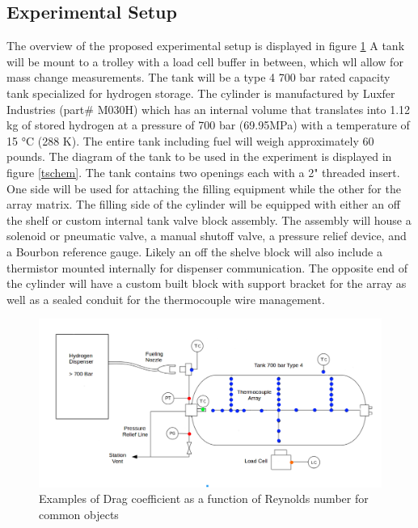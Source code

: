 \documentclass[paper=a4, fontsize=11pt, abstract=on]{scrartcl}
\numberwithin{equation}{section}		%
\numberwithin{figure}{section}			%
\numberwithin{table}{section}				%
\begin{document}
\subsection{Experimental Setup}
The overview of the proposed experimental setup is displayed in figure \ref{exp}
A tank will be mount to a trolley with a load cell buffer in between, which wll allow for mass change measurements. The tank will be a type 4 700 bar rated capacity tank specialized for hydrogen storage. The cylinder is manufactured by Luxfer Industries (part\# M030H) which has an internal volume that translates into 1.12 kg of stored hydrogen at a pressure of 700 bar (69.95MPa) with a temperature of 15 °C (288 K). The entire tank including fuel will weigh approximately 60 pounds. The diagram of the tank to be used in the experiment is displayed in figure \ref{tschem}. The tank contains two openings each with a 2" threaded insert. One side will be used for attaching the filling equipment while the other for the array matrix. The filling side of the cylinder will be equipped with either an off the shelf or custom internal tank valve block assembly. The assembly will house a solenoid or pneumatic valve, a manual shutoff valve, a pressure relief device, and a Bourbon reference gauge. Likely an off the shelve block will also include a thermistor mounted internally for dispenser communication. The opposite end of the cylinder will have a custom built block with support bracket for the array as well as a sealed conduit for the thermocouple wire management.


\begin{figure}[H]
\centering
\includegraphics[width=0.95\linewidth]{schem2}
\caption{Examples of Drag coefficient as a function of Reynolds number for common objects}
\label{exp}
\end{figure}
\end{document}
